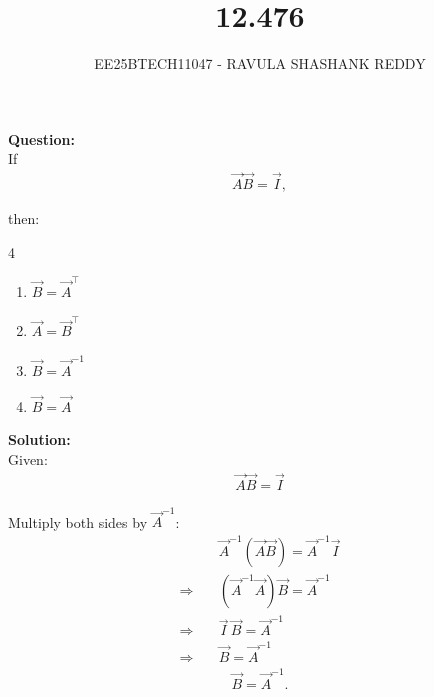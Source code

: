 \documentclass[journal]{article}
\begin{document}
	
	
	\vspace{3cm}
	
\title{12.476}
\author{EE25BTECH11047 - RAVULA SHASHANK REDDY}
\maketitle
\hrulefill
\bigskip 

\renewcommand{\thetable}{\theenumi}
\setlength{\intextsep}{10pt}

\textbf{Question:} \\

If
\begin{align*}
\vec{A} \vec{B} = \vec{I},
\end{align*}

then:

\begin{multicols}{4}
\begin{enumerate}[label=\alph*)]
    \item $\vec{B} = \vec{A}^{\top}$
    \item $\vec{A} = \vec{B}^{\top}$
    \item $\vec{B} = \vec{A}^{-1}$
    \item $\vec{B} = \vec{A}$
\end{enumerate}
\end{multicols}

\textbf{Solution:}\\

Given:
\begin{align}
 \vec{A} \vec{B} = \vec{I} 
 \end{align}
 
Multiply both sides by  $\vec{A}^{-1}$: 
\begin{align}
&\vec{A}^{-1} (\vec{A} \vec{B}) = \vec{A}^{-1} \vec{I} \\
\Rightarrow \quad & (\vec{A}^{-1} \vec{A}) \vec{B} = \vec{A}^{-1} \\
\Rightarrow \quad & \vec{I} \, \vec{B} = \vec{A}^{-1} \\
\Rightarrow \quad & \vec{B} = \vec{A}^{-1}
\end{align}
\begin{align}
 \boxed{\vec{B} = \vec{A}^{-1}}.
\end{align}
\end{document}
